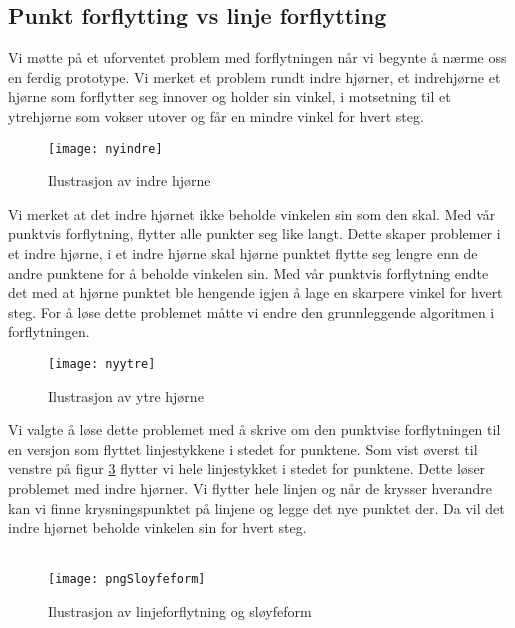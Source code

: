 \subsection{Punkt forflytting vs linje forflytting} 
Vi møtte på et uforventet problem med forflytningen når vi begynte å nærme oss en ferdig prototype. Vi merket et problem rundt indre hjørner, et indrehjørne et hjørne som forflytter seg innover og holder sin vinkel, i motsetning til et ytrehjørne som vokser utover og får en mindre vinkel for hvert steg. \\
\begin{figure}[h]
    \centering
    \texttt{[image: nyindre]}
    \caption{Ilustrasjon av indre hjørne}
    \label{fig:my_label}
\end{figure}

\noindent
Vi merket at det indre hjørnet ikke beholde vinkelen sin som den skal. Med vår punktvis forflytning, flytter alle punkter seg like langt. Dette skaper problemer i et indre hjørne, i et indre hjørne skal hjørne punktet flytte seg lengre enn de andre punktene for å beholde vinkelen sin. Med vår punktvis forflytning endte det med at hjørne punktet ble hengende igjen å lage en skarpere vinkel for hvert steg. For å løse dette problemet måtte vi endre den grunnleggende algoritmen i forflytningen.\\ 
\begin{figure}[h]
    \centering
    \texttt{[image: nyytre]}
    \caption{Ilustrasjon av ytre hjørne}
    \label{fig:my_label}
\end{figure}
\clearpage
\noindent
Vi valgte å løse dette problemet med å skrive om den punktvise forflytningen til en versjon som flyttet linjestykkene i stedet for punktene. Som vist øverst til venstre på figur \ref{fig:sloyfe} flytter vi hele linjestykket i stedet for punktene. Dette løser problemet med indre hjørner. Vi flytter hele linjen og når de krysser hverandre kan vi finne krysningspunktet på linjene og legge det nye punktet der. Da vil det indre hjørnet beholde vinkelen sin for hvert steg. \\ \\
\begin{figure}[h]
    \centering
    \texttt{[image: pngSloyfeform]}
    \caption{Ilustrasjon av linjeforflytning og sløyfeform}
    \label{fig:sloyfe}
\end{figure}

